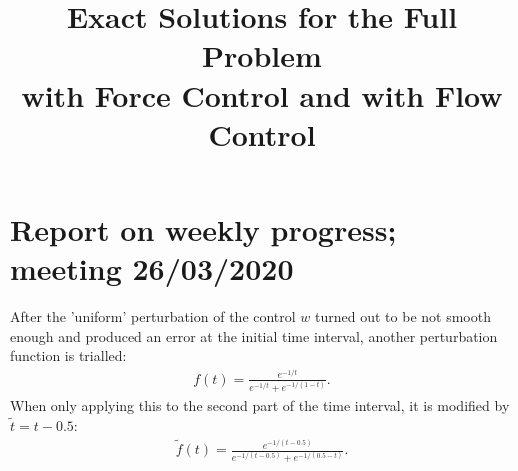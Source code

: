 \documentclass[11pt, a4paper]{article}
\title{Exact Solutions for the Full Problem \\with Force Control and with Flow Control}
\date{}
\theoremstyle{definition}
\begin{document}

\section*{Report on weekly progress; meeting 26/03/2020}
After the 'uniform' perturbation of the control $w$ turned out to be not smooth enough and produced an error at the initial time interval, another perturbation function is trialled:
\begin{align*}
f(t) = \frac{e^{-1/t}}{e^{-1/t} + e^{-1/(1-t)}}.
\end{align*}
When only applying this to the second part of the time interval, it is modified by $\tilde t = t - 0.5$:
\begin{align*}
\tilde f(t) = \frac{e^{-1/(t-0.5)}}{e^{-1/(t-0.5)} + e^{-1/(0.5-t)}}.
\end{align*}
\end{document}
